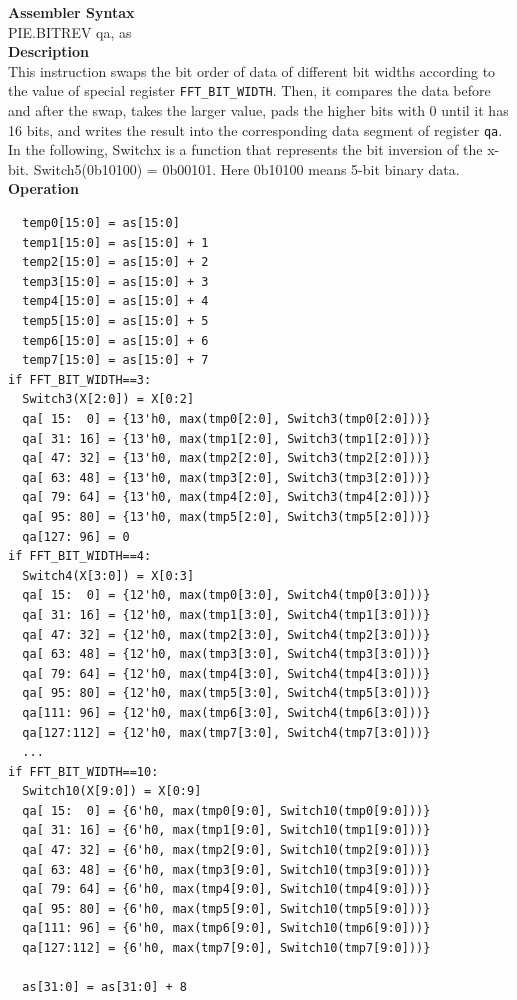 \textbf{Assembler Syntax} \\
PIE.BITREV qa, as \\
\textbf{Description} \\
This instruction swaps the bit order of data of different bit widths according to the value of special register \lstinline{FFT_BIT_WIDTH}. Then, it compares the data before and after the swap, takes the larger value, pads the higher bits with 0 until it has 16 bits, and writes the result into the corresponding data segment of register \lstinline{qa}. In the following, Switchx is a function that represents the bit inversion of the x-bit. Switch5(0b10100) = 0b00101. Here 0b10100 means 5-bit binary data.\\
\textbf{Operation}
\begin{lstlisting}
  temp0[15:0] = as[15:0]
  temp1[15:0] = as[15:0] + 1
  temp2[15:0] = as[15:0] + 2
  temp3[15:0] = as[15:0] + 3
  temp4[15:0] = as[15:0] + 4
  temp5[15:0] = as[15:0] + 5
  temp6[15:0] = as[15:0] + 6
  temp7[15:0] = as[15:0] + 7
if FFT_BIT_WIDTH==3:
  Switch3(X[2:0]) = X[0:2]
  qa[ 15:  0] = {13'h0, max(tmp0[2:0], Switch3(tmp0[2:0]))}
  qa[ 31: 16] = {13'h0, max(tmp1[2:0], Switch3(tmp1[2:0]))}
  qa[ 47: 32] = {13'h0, max(tmp2[2:0], Switch3(tmp2[2:0]))}
  qa[ 63: 48] = {13'h0, max(tmp3[2:0], Switch3(tmp3[2:0]))}
  qa[ 79: 64] = {13'h0, max(tmp4[2:0], Switch3(tmp4[2:0]))}
  qa[ 95: 80] = {13'h0, max(tmp5[2:0], Switch3(tmp5[2:0]))}
  qa[127: 96] = 0
if FFT_BIT_WIDTH==4:
  Switch4(X[3:0]) = X[0:3]
  qa[ 15:  0] = {12'h0, max(tmp0[3:0], Switch4(tmp0[3:0]))}
  qa[ 31: 16] = {12'h0, max(tmp1[3:0], Switch4(tmp1[3:0]))}
  qa[ 47: 32] = {12'h0, max(tmp2[3:0], Switch4(tmp2[3:0]))}
  qa[ 63: 48] = {12'h0, max(tmp3[3:0], Switch4(tmp3[3:0]))}
  qa[ 79: 64] = {12'h0, max(tmp4[3:0], Switch4(tmp4[3:0]))}
  qa[ 95: 80] = {12'h0, max(tmp5[3:0], Switch4(tmp5[3:0]))}
  qa[111: 96] = {12'h0, max(tmp6[3:0], Switch4(tmp6[3:0]))}
  qa[127:112] = {12'h0, max(tmp7[3:0], Switch4(tmp7[3:0]))}
  ...
if FFT_BIT_WIDTH==10:
  Switch10(X[9:0]) = X[0:9]
  qa[ 15:  0] = {6'h0, max(tmp0[9:0], Switch10(tmp0[9:0]))}
  qa[ 31: 16] = {6'h0, max(tmp1[9:0], Switch10(tmp1[9:0]))}
  qa[ 47: 32] = {6'h0, max(tmp2[9:0], Switch10(tmp2[9:0]))}
  qa[ 63: 48] = {6'h0, max(tmp3[9:0], Switch10(tmp3[9:0]))}
  qa[ 79: 64] = {6'h0, max(tmp4[9:0], Switch10(tmp4[9:0]))}
  qa[ 95: 80] = {6'h0, max(tmp5[9:0], Switch10(tmp5[9:0]))}
  qa[111: 96] = {6'h0, max(tmp6[9:0], Switch10(tmp6[9:0]))}
  qa[127:112] = {6'h0, max(tmp7[9:0], Switch10(tmp7[9:0]))}

  as[31:0] = as[31:0] + 8
\end{lstlisting}


